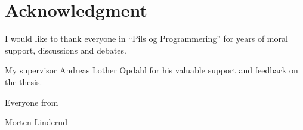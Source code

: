 \documentclass[../Main/thesis.tex]{subfiles}
\begin{document}
\chapter*{Acknowledgment}
I would like to thank everyone in ``Pils og Programmering'' for years of moral
support, discussions and debates.

My supervisor Andreas Lother Opdahl for his valuable support and feedback on the
thesis.

Everyone from 

\begin{flushright}
Morten Linderud\\[1pc]
\end{flushright}

\blankpage
\end{document}

